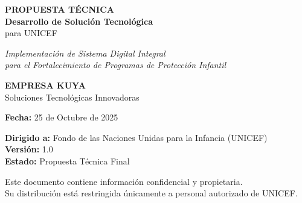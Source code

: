 \begin{titlepage}
    \centering
    
    
    \vspace{2cm}
    
    {\Huge\bfseries PROPUESTA TÉCNICA\\[0.5cm]}
    {\Large\bfseries Desarrollo de Solución Tecnológica\\[0.3cm]}
    {\Large para UNICEF\\[2cm]}
    
    {\large\textit{Implementación de Sistema Digital Integral\\
    para el Fortalecimiento de Programas de Protección Infantil}\\[3cm]}
    
    {\Large\bfseries EMPRESA KUYA\\[0.5cm]}
    {\large Soluciones Tecnológicas Innovadoras\\[2cm]}
    
    {\large\textbf{Fecha:} 25 de Octubre de 2025\\[1cm]}
    
    {\normalsize
    \textbf{Dirigido a:} Fondo de las Naciones Unidas para la Infancia (UNICEF)\\[0.3cm]
    \textbf{Versión:} 1.0\\[0.3cm]
    \textbf{Estado:} Propuesta Técnica Final\\
    }
    
    \vfill
    
    {\footnotesize
    Este documento contiene información confidencial y propietaria.\\
    Su distribución está restringida únicamente a personal autorizado de UNICEF.
    }
    
\end{titlepage}

\newpage
\thispagestyle{empty}
\mbox{}
\newpage